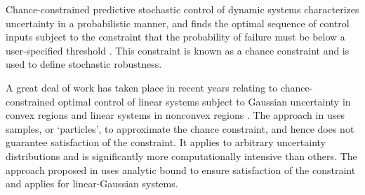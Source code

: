 
Chance-constrained predictive stochastic control of  dynamic systems  characterizes uncertainty in a probabilistic manner, and finds the optimal sequence of control inputs subject to the constraint that the probability of failure must be below a user-specified threshold \cite{Blackmore:2011}. This constraint is known as a chance constraint \cite{Blackmore:2011} and is used to define stochastic robustness.

A great deal of work has taken place in recent years relating to chance-constrained optimal control of linear systems subject to Gaussian uncertainty in convex regions \cite{Schwarm:1999,Li:2002,Ono:2008} and linear systems in nonconvex regions \cite{Blackmore:2010,Blackmore:2011}.
The approach in \cite{Blackmore:2010} uses samples, or ‘particles’, to approximate the  chance constraint, and hence does not guarantee satisfaction of the constraint. It applies to arbitrary uncertainty distributions and is significantly more computationally intensive than others. The approach proposed in \cite{Blackmore:2011} uses analytic bound to ensure satisfaction of the constraint and applies for linear-Gaussian systems.

